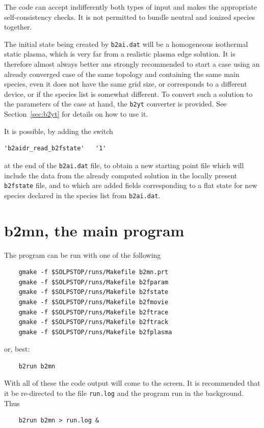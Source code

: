 \documentclass[a4paper,10pt]{report}
\begin{document}
The code can accept indifferently both types of input and makes the
appropriate self-consistency checks. It is not permitted to bundle
neutral and ionized species together.

The initial state being created by {\tt b2ai.dat} will be a homogeneous
isothermal static plasma, which is very far from a realistic plasma edge
solution. It is therefore almost always better ans strongly recommended
to start a case using an already converged case of the same topology and
containing the same main species, even it does not have the same grid size,
or corresponds to a different device, or if the species list is somewhat
different. To convert such a solution to the parameters of the case at hand,
the {\tt b2yt} converter is provided. See Section~\ref{sec:b2yt} for details
on how to use it.

It is possible, by adding the switch
\begin{verbatim}
'b2aidr_read_b2fstate'   '1'
\end{verbatim}
at the end of the {\tt b2ai.dat} file, to obtain a new starting point file
which will include the data from the already computed solution in the locally
present {\tt b2fstate} file, and to which are added fields corresponding to
a flat state for new species declared in the species list from {\tt b2ai.dat}.

\newpage
\section{b2mn, the main program}
\label{sec:b2mn}

The program can be run with one of the following
\begin{verbatim}
    gmake -f $SOLPSTOP/runs/Makefile b2mn.prt
    gmake -f $SOLPSTOP/runs/Makefile b2fparam
    gmake -f $SOLPSTOP/runs/Makefile b2fstate
    gmake -f $SOLPSTOP/runs/Makefile b2fmovie
    gmake -f $SOLPSTOP/runs/Makefile b2ftrace
    gmake -f $SOLPSTOP/runs/Makefile b2ftrack
    gmake -f $SOLPSTOP/runs/Makefile b2fplasma
\end{verbatim}
or, best:
\begin{verbatim}
    b2run b2mn
\end{verbatim}

With all of these the code output will come to the screen.  It is
recommended that it be re-directed to the file {\tt run.log} and the
program run in the background.  Thus
\begin{verbatim}
    b2run b2mn > run.log &
\end{verbatim}
\end{document}
